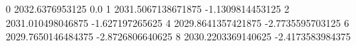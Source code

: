 0 2032.6376953125 0.0
1 2031.5067138671875 -1.1309814453125
2 2031.010498046875 -1.627197265625
4 2029.8641357421875 -2.7735595703125
6 2029.7650146484375 -2.8726806640625
8 2030.2203369140625 -2.4173583984375
